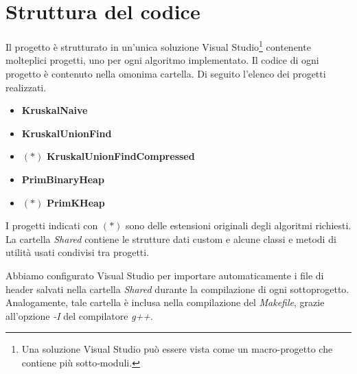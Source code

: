 \section{Struttura del codice}
\label{cap:code-structure}

Il progetto è strutturato in un'unica soluzione Visual Studio\footnote{Una soluzione Visual Studio può essere vista come un macro-progetto che contiene più sotto-moduli.} contenente molteplici progetti, uno per ogni algoritmo implementato. Il codice di ogni progetto è contenuto nella omonima cartella. Di seguito l'elenco dei progetti realizzati.

\begin{itemize}
    \item \textbf{KruskalNaive}
    \item \textbf{KruskalUnionFind}
    \item $(*)$ \textbf{KruskalUnionFindCompressed}
    \item \textbf{PrimBinaryHeap}
    \item $(*)$ \textbf{PrimKHeap}
\end{itemize}

\noindent I progetti indicati con $(*)$ sono delle estensioni originali degli algoritmi richiesti.
\\

\noindent La cartella \textit{Shared} contiene le strutture dati custom e alcune classi e metodi di utilità usati
condivisi tra progetti.

\noindent Abbiamo configurato Visual Studio per importare automaticamente i file di header salvati nella cartella \textit{Shared}
durante la compilazione di ogni sottoprogetto. Analogamente, tale cartella è inclusa nella compilazione del \textit{Makefile}, grazie all'opzione \textit{-I} del compilatore \textit{g++}.

